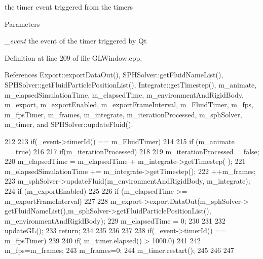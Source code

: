 the timer event triggered from the timers 


\begin{DoxyParams}{Parameters}
\item[{\em \_\-event}]the event of the timer triggered by Qt \end{DoxyParams}


Definition at line 209 of file GLWindow.cpp.



References Export::exportDataOut(), SPHSolver::getFluidNameList(), SPHSolver::getFluidParticlePositionList(), Integrate::getTimestep(), m\_\-animate, m\_\-elapsedSimulationTime, m\_\-elapsedTime, m\_\-environmentAndRigidBody, m\_\-export, m\_\-exportEnabled, m\_\-exportFrameInterval, m\_\-FluidTimer, m\_\-fps, m\_\-fpsTimer, m\_\-frames, m\_\-integrate, m\_\-iterationProcessed, m\_\-sphSolver, m\_\-timer, and SPHSolver::updateFluid().




\begin{DoxyCode}
212 {
213         if(_event->timerId() == m_FluidTimer)
214         {
215                 if (m_animate ==true)
216                 {                                        
217                     if(m_iterationProcessed)
218                     {
219                         m_iterationProcessed = false;
220                         m_elapsedTime = m_elapsedTime + m_integrate->getTimestep(
      );
221                         m_elapsedSimulationTime += m_integrate->getTimestep();
222                         ++m_frames;
223                         m_sphSolver->updateFluid(m_environmentAndRigidBody,
      m_integrate);
224                         if (m_exportEnabled)
225                         {
226                             if (m_elapsedTime >= m_exportFrameInterval)
227                             {
228                             m_export->exportDataOut(m_sphSolver->
      getFluidNameList(),m_sphSolver->getFluidParticlePositionList(),
      m_environmentAndRigidBody);
229                             m_elapsedTime = 0;
230                             }
231                         }
232                         updateGL();
233                         return;
234                     }
235                 }
236 
237         }
238         if(_event->timerId() == m_fpsTimer)
239           {
240             if( m_timer.elapsed() > 1000.0)
241             {
242               m_fps=m_frames;
243               m_frames=0;
244               m_timer.restart();
245             }
246            }
247 }
\end{DoxyCode}




